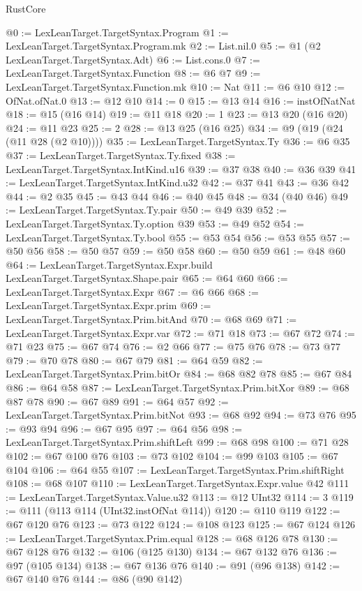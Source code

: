 \begin{lexlean}{RustCore}
\begin{coremodule}
{\begin{coremodule}
{{{{{@0 := LexLeanTarget.TargetSyntax.Program
@1 := LexLeanTarget.TargetSyntax.Program.mk
@2 := List.nil.{0}
@5 := @1 (@2 LexLeanTarget.TargetSyntax.Adt)
@6 := List.cons.{0}
@7 := LexLeanTarget.TargetSyntax.Function
@8 := @6 @7
@9 := LexLeanTarget.TargetSyntax.Function.mk
@10 := Nat
@11 := @6 @10
@12 := OfNat.ofNat.{0}
@13 := @12 @10
@14 := 0
@15 := @13 @14
@16 := instOfNatNat
@18 := @15 (@16 @14)
@19 := @11 @18
@20 := 1
@23 := @13 @20 (@16 @20)
@24 := @11 @23
@25 := 2
@28 := @13 @25 (@16 @25)
@34 := @9 (@19 (@24 (@11 @28 (@2 @10))))
@35 := LexLeanTarget.TargetSyntax.Ty
@36 := @6 @35
@37 := LexLeanTarget.TargetSyntax.Ty.fixed
@38 := LexLeanTarget.TargetSyntax.IntKind.u16
@39 := @37 @38
@40 := @36 @39
@41 := LexLeanTarget.TargetSyntax.IntKind.u32
@42 := @37 @41
@43 := @36 @42
@44 := @2 @35
@45 := @43 @44
@46 := @40 @45
@48 := @34 (@40 @46)
@49 := LexLeanTarget.TargetSyntax.Ty.pair
@50 := @49 @39
@52 := LexLeanTarget.TargetSyntax.Ty.option @39
@53 := @49 @52
@54 := LexLeanTarget.TargetSyntax.Ty.bool
@55 := @53 @54
@56 := @53 @55
@57 := @50 @56
@58 := @50 @57
@59 := @50 @58
@60 := @50 @59
@61 := @48 @60
@64 := LexLeanTarget.TargetSyntax.Expr.build LexLeanTarget.TargetSyntax.Shape.pair
@65 := @64 @60
@66 := LexLeanTarget.TargetSyntax.Expr
@67 := @6 @66
@68 := LexLeanTarget.TargetSyntax.Expr.prim
@69 := LexLeanTarget.TargetSyntax.Prim.bitAnd
@70 := @68 @69
@71 := LexLeanTarget.TargetSyntax.Expr.var
@72 := @71 @18
@73 := @67 @72
@74 := @71 @23
@75 := @67 @74
@76 := @2 @66
@77 := @75 @76
@78 := @73 @77
@79 := @70 @78
@80 := @67 @79
@81 := @64 @59
@82 := LexLeanTarget.TargetSyntax.Prim.bitOr
@84 := @68 @82 @78
@85 := @67 @84
@86 := @64 @58
@87 := LexLeanTarget.TargetSyntax.Prim.bitXor
@89 := @68 @87 @78
@90 := @67 @89
@91 := @64 @57
@92 := LexLeanTarget.TargetSyntax.Prim.bitNot
@93 := @68 @92
@94 := @73 @76
@95 := @93 @94
@96 := @67 @95
@97 := @64 @56
@98 := LexLeanTarget.TargetSyntax.Prim.shiftLeft
@99 := @68 @98
@100 := @71 @28
@102 := @67 @100 @76
@103 := @73 @102
@104 := @99 @103
@105 := @67 @104
@106 := @64 @55
@107 := LexLeanTarget.TargetSyntax.Prim.shiftRight
@108 := @68 @107
@110 := LexLeanTarget.TargetSyntax.Expr.value @42
@111 := LexLeanTarget.TargetSyntax.Value.u32
@113 := @12 UInt32
@114 := 3
@119 := @111 (@113 @114 (UInt32.instOfNat @114))
@120 := @110 @119
@122 := @67 @120 @76
@123 := @73 @122
@124 := @108 @123
@125 := @67 @124
@126 := LexLeanTarget.TargetSyntax.Prim.equal
@128 := @68 @126 @78
@130 := @67 @128 @76
@132 := @106 (@125 @130)
@134 := @67 @132 @76
@136 := @97 (@105 @134)
@138 := @67 @136 @76
@140 := @91 (@96 @138)
@142 := @67 @140 @76
@144 := @86 (@90 @142)
}}}}}
\end{coremodule}}
\end{coremodule}
\end{lexlean}
